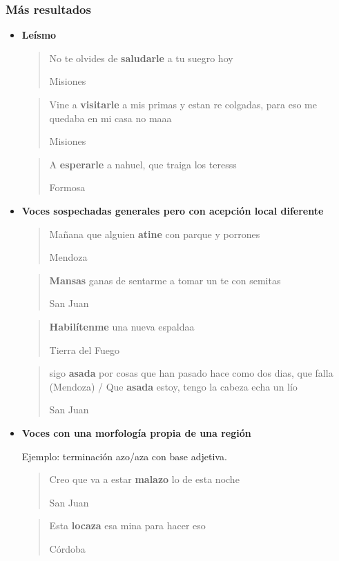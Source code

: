 \begin{frame}[t]\frametitle{Más resultados}
    

\begin{itemize}
  
\item \textbf{Leísmo}

  \blockquote[Misiones]{No te olvides de \textbf{saludarle} a tu suegro hoy}

  \blockquote[Misiones]{Vine a \textbf{visitarle} a mis primas y estan re colgadas, para eso me quedaba en mi casa no maaa }

  \blockquote[Formosa]{A \textbf{esperarle} a nahuel, que traiga los teresss }





\item \textbf{Voces sospechadas generales pero con acepción local diferente}

  \blockquote[Mendoza]{Mañana que alguien \textbf{atine} con parque y porrones}

  \blockquote[San Juan]{\textbf{Mansas} ganas de sentarme a tomar un te con semitas}

  \blockquote[Tierra del Fuego]{\textbf{Habilítenme} una nueva espaldaa}

  \blockquote[San Juan]{sigo \textbf{asada} por cosas que han pasado hace como dos dias, que falla (Mendoza) / Que \textbf{asada} estoy, tengo la cabeza echa un lío}


\item \textbf{Voces con una morfología propia de una región}

Ejemplo: terminación azo/aza con base adjetiva.

  \blockquote[San Juan]{Creo que va a estar \textbf{malazo} lo de esta noche } 

  \blockquote[Córdoba]{Esta \textbf{locaza} esa mina para hacer eso}


\end{itemize}
\end{frame}
